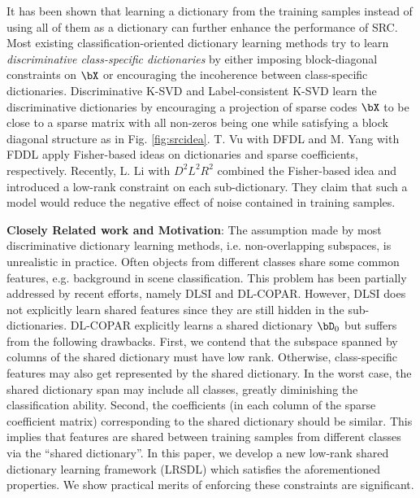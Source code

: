 \documentclass[letterpaper]{article}
\begin{document}
\par
It has been shown that learning a dictionary from the training samples instead of using all of them as a dictionary can further enhance the performance of SRC. Most existing classification-oriented dictionary learning methods try to learn {\em discriminative class-specific dictionaries} by either imposing block-diagonal constraints on $\bX$ or encouraging the incoherence between class-specific dictionaries. Discriminative K-SVD\cite{zhang2010discriminative} and Label-consistent K-SVD\cite{Zhuolin2013LCKSVD} learn the discriminative dictionaries by encouraging a projection of sparse codes $\bX$ to be close to a sparse matrix with all non-zeros being one while satisfying a block diagonal structure as in Fig. \ref{fig:srcidea}.  T. Vu \etal \cite{vu2015dfdl,vu2015tmi} with DFDL and M. Yang \etal\cite{Meng2011FDDL} with FDDL apply Fisher-based ideas on dictionaries and sparse coefficients, respectively. Recently, L. Li \etal\cite{li2014learning} with $D^2L^2R^2$ combined the Fisher-based idea and introduced a low-rank constraint on each sub-dictionary. They claim that such a model would reduce the negative effect of noise contained in training samples.

{\bf Closely Related work and Motivation}: The assumption made by most discriminative dictionary learning methods, i.e. non-overlapping subspaces, is unrealistic in practice. Often objects from different classes share some common features, e.g. background in scene classification. This problem has been partially addressed by recent efforts, namely DLSI\cite{ramirez2010classification} and DL-COPAR\cite{kong2012dictionary}. However, DLSI does not explicitly learn shared features since they are still hidden in the sub-dictionaries. DL-COPAR explicitly learns a shared dictionary $\bD_0$ but suffers from the following drawbacks. First, we contend that the subspace spanned by columns of the shared dictionary must have low rank. Otherwise,  class-specific features may also get represented by the shared dictionary. In the worst case, the shared dictionary span may include all classes, greatly diminishing the classification ability. Second, the coefficients (in each column of the sparse coefficient matrix) corresponding to the shared dictionary should be similar. This implies that features are shared between training samples from different classes via the ``shared dictionary''. In this paper, we develop a new low-rank shared dictionary learning framework (LRSDL) which satisfies the aforementioned properties. We show practical merits of enforcing these constraints are significant.
\par
\end{document}
